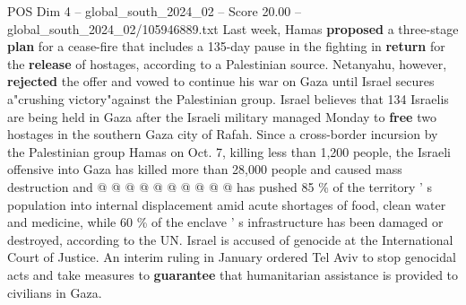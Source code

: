 \begin{textsample}{POS Dim 4 – global\_south\_2024\_02 – Score 20.00 – global\_south\_2024\_02/105946889.txt}
Last week, Hamas \textbf{proposed} a three-stage \textbf{plan} for a cease-fire that includes a 135-day pause in the fighting in \textbf{return} for the \textbf{release} of hostages, according to a Palestinian source.
Netanyahu, however, \textbf{rejected} the offer and vowed to continue his war on Gaza until Israel secures a"crushing victory"against the Palestinian group.
Israel believes that 134 Israelis are being held in Gaza after the Israeli military managed Monday to \textbf{free} two hostages in the southern Gaza city of Rafah.
Since a cross-border incursion by the Palestinian group Hamas on Oct. 7, killing less than 1,200 people, the Israeli offensive into Gaza has killed more than 28,000 people and caused mass destruction and @ @ @ @ @ @ @ @ @ @ has pushed 85 \% of the territory ' s population into internal displacement amid acute shortages of food, clean water and medicine, while 60 \% of the enclave ' s infrastructure has been damaged or destroyed, according to the UN.
Israel is accused of genocide at the International Court of Justice.
An interim ruling in January ordered Tel Aviv to stop genocidal acts and take measures to \textbf{guarantee} that humanitarian assistance is provided to civilians in Gaza.

\end{textsample}
